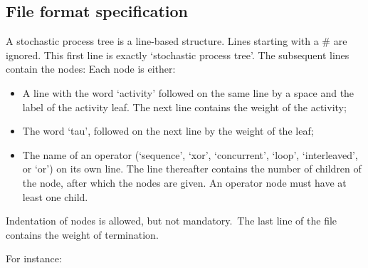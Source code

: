 {\subsection*{File format specification}A stochastic process tree is a line-based structure. Lines starting with a \# are ignored.
    This first line is exactly `stochastic process tree'.
    The subsequent lines contain the nodes:
    Each node is either:
    \begin{itemize}
        \item A line with the word `activity' followed on the same line by a space and the label of the activity leaf. The next line contains the weight of the activity;
        \item The word `tau', followed on the next line by the weight of the leaf;
        \item The name of an operator (`sequence', `xor', `concurrent', `loop', `interleaved', or `or') on its own line.
        The line thereafter contains the number of children of the node, after which the nodes are given.
        An operator node must have at least one child.
    \end{itemize}
    Indentation of nodes is allowed, but not mandatory.\
    The last line of the file contains the weight of termination.
    
    For instance:
    
}
